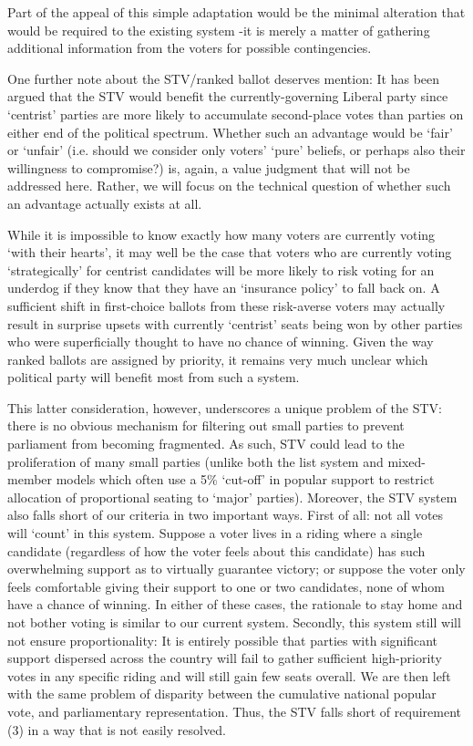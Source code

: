 \documentclass[DIV=calc, paper=a4, fontsize=11pt, twocolumn]{scrartcl}	 %
\begin{document}
Part of the appeal of this simple adaptation would be the minimal alteration that would be required to the existing system \--it is merely a matter of gathering additional information from the voters for possible contingencies.

One further note about the STV/ranked ballot deserves mention: It has been argued\cite{Record}
 that the STV would benefit the currently-governing Liberal party since  `centrist' parties are more likely to accumulate second-place votes than parties on either end of the political spectrum. 
Whether such an advantage would be `fair' or `unfair' (i.e. should we consider only voters' `pure' beliefs, or perhaps also their willingness to compromise?) is, again, a value judgment that will not be addressed here. Rather, we will focus on the technical question of whether such an advantage actually exists at all.

While it is impossible to know exactly how many voters are currently voting `with their hearts', it may well be the case that voters who are currently voting `strategically' for centrist candidates will be more likely to risk voting for an underdog if they know that they have an `insurance policy' to fall back on. 
A sufficient shift in first-choice ballots from these risk-averse voters may actually result in surprise upsets with currently `centrist' seats being won by other parties who were superficially thought to have no chance of winning. Given the way ranked ballots are assigned by priority, it remains very much unclear which political party will benefit most from such a system. 

This latter consideration, however, underscores a unique problem of the STV:  there is no obvious mechanism for filtering out small parties to prevent parliament from becoming fragmented. As such, STV could lead to the proliferation of many small parties
(unlike both the list system and  mixed-member models which often use a 5\% `cut-off' in popular support to restrict allocation of proportional seating to `major' parties). 
Moreover, the STV system also falls short of our criteria in two important ways.
First of all: not all votes will `count' in this system. Suppose a voter lives in a riding where a single candidate (regardless of how the voter feels about this candidate) has such overwhelming support as to virtually guarantee victory; or suppose the voter only feels comfortable giving their support to one or two candidates, none of whom have a chance of winning. In either of these cases, the rationale to stay home and not bother voting is similar to our current system. 
Secondly, this system still will not ensure proportionality: It is entirely possible that parties with significant support dispersed across the country will fail to gather sufficient high-priority votes in any specific riding and will still gain few seats overall.  
We are then left with the same problem of disparity between the cumulative national popular vote, and parliamentary representation.
Thus, the STV falls short of requirement (3) in a way that is not easily resolved. 
\end{document}
